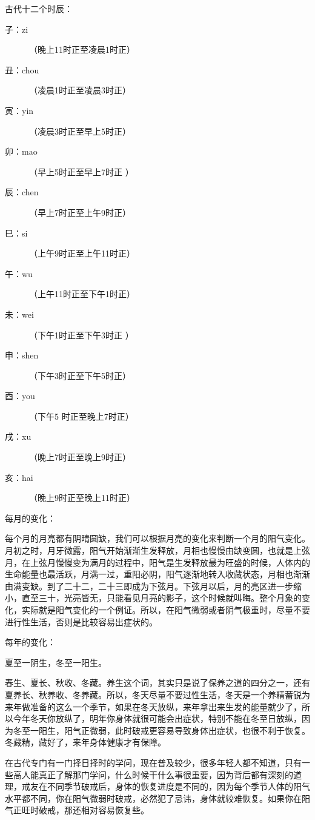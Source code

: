 \documentclass{ctexart}
\begin{document}
古代十二个时辰：

\begin{description}
    \item[子：zi] （晚上11时正至凌晨1时正）
    \item[丑：chou] （凌晨1时正至凌晨3时正）
    \item[寅：yin] （凌晨3时正至早上5时正）
    \item[卯：mao] （早上5时正至早上7时正 ）
    \item[辰：chen] （早上7时正至上午9时正）
    \item[巳：si] （上午9时正至上午11时正）
    \item[午：wu] （上午11时正至下午1时正）
    \item[未：wei] （下午1时正至下午3时正 ）
    \item[申：shen] （下午3时正至下午5时正）
    \item[酉：you] （下午5 时正至晚上7时正）
    \item[戌：xu] （晚上7时正至晚上9时正）
    \item[亥：hai] （晚上9时正至晚上11时正）
\end{description}

每月的变化：

每个月的月亮都有阴晴圆缺，我们可以根据月亮的变化来判断一个月的阳气变化。月初之时，月牙微露，阳气开始渐渐生发释放，月相也慢慢由缺变圆，也就是上弦月，在上弦月慢慢变为满月的过程中，阳气是生发释放最为旺盛的时候，人体内的生命能量也最活跃，月满一过，重阳必阴，阳气逐渐地转入收藏状态，月相也渐渐由满变缺。到了二十二，二十三即成为下弦月。下弦月以后，月的亮区进一步缩小，直至三十，光亮皆无，只能看见月亮的影子，这个时候就叫晦。整个月象的变化，实际就是阳气变化的一个例证。所以，在阳气微弱或者阴气极重时，尽量不要进行性生活，否则是比较容易出症状的。

每年的变化：

夏至一阴生，冬至一阳生。

春生、夏长、秋收、冬藏。养生这个词，其实只是说了保养之道的四分之一，还有夏养长、秋养收、冬养藏。所以，冬天尽量不要过性生活，冬天是一个养精蓄锐为来年做准备的这么一个季节，如果在冬天放纵，来年拿出来生发的能量就少了，所以今年冬天你放纵了，明年你身体就很可能会出症状，特别不能在冬至日放纵，因为冬至一阳生，阳气正微弱，此时破戒更容易导致身体出症状，也很不利于恢复。冬藏精，藏好了，来年身体健康才有保障。

在古代专门有一门择日择时的学问，现在普及较少，很多年轻人都不知道，只有一些高人能真正了解那门学问，什么时候干什么事很重要，因为背后都有深刻的道理，戒友在不同季节破戒后，身体的恢复进度是不同的，因为每个季节人体的阳气水平都不同，你在阳气微弱时破戒，必然犯了忌讳，身体就较难恢复。如果你在阳气正旺时破戒，那还相对容易恢复些。
\end{document}

